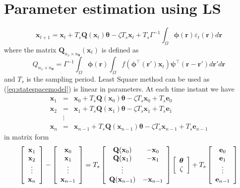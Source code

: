 \documentclass[12pt]{iopart}		%
\begin{document}
\section{Parameter estimation using LS}
\begin{equation}
 \mathbf x_{t+1}=\mathbf{x}_{t}+T_s \mathbf{Q}(\mathbf{x}_t)\boldsymbol{\theta}-\zeta T_s\mathbf{x}_t+T_s\Gamma^{-1}\int_\Omega\boldsymbol{\phi}(\mathbf r)\varepsilon_t(\mathbf r)d\mathbf r
\label{eq:statespacemodel}
\end{equation}
where the matrix $\mathbf Q_{n_x \times n_{\boldsymbol{\theta}}}(\mathbf x_t)$ is defined as
\begin{equation}
 Q_{n_x \times n_{\boldsymbol{\theta}}}=\Gamma^{-1}\int_\Omega\boldsymbol{\phi}(\mathbf r)\int_\Omega f(\boldsymbol{\phi}^\top(\mathbf r')\mathbf x_t)\mathbf{\psi}^\top(\mathbf r-\mathbf r')d\mathbf r'd\mathbf r
\end{equation}
and $T_s$ is the sampling period. Least Square method can be used as (\ref{eq:statespacemodel}) is linear in parameters. At each time instant we have
\begin{eqnarray}
 \mathbf x_{1}&=&\mathbf x_{0}+T_s \mathbf Q(\mathbf x_0) \boldsymbol{\theta}-\zeta T_s\mathbf x_0+T_s\mathbf e_0 \nonumber \\
 \mathbf x_{2}&=&\mathbf x_{1}+T_s \mathbf Q(\mathbf x_1) \boldsymbol{\theta}-\zeta T_s\mathbf x_1+T_s\mathbf e_1\nonumber\\
&\vdots& \nonumber\\
 \mathbf x_{n}&=&\mathbf x_{n-1}+T_s \mathbf Q(\mathbf x_{n-1}) \boldsymbol{\theta}-\zeta T_s\mathbf x_{n-1}+T_s\mathbf e_{n-1}
\end{eqnarray}
in matrix form
\begin{equation}
 \left[\begin{array}{{cccc}} \mathbf x_{1}\\\mathbf x_{2}\\\vdots\\\mathbf x_{n}\end{array}\right]
	-\left[\begin{array}{cccc} \mathbf x_{0}\\\mathbf x_{1}\\\vdots\\\mathbf x_{n-1}\end{array}\right]
	=T_s\left[\begin{array}{cc}\mathbf Q(\mathbf x_0)&-\mathbf x_{0}\\\mathbf Q(\mathbf x_1)&-\mathbf x_{1}\\\vdots\\ \mathbf Q(\mathbf x_{n-1})&-\mathbf x_{n-1}\end{array}\right]
	\left[\begin{array}{cc} \boldsymbol{\theta} \\ \zeta\end{array}\right]+T_s
		\left[\begin{array}{cccc}\mathbf e_0\\\mathbf e_1\\\vdots\\\mathbf e_{n-1}\end{array}\right]
\end{equation}
\end{document}
